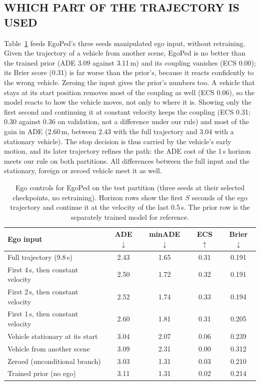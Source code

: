 \documentclass{ieeeoj}
\newcommand{\method}{EgoPed\xspace}
\begin{document}
\subsection{WHICH PART OF THE TRAJECTORY IS USED}
\label{sec:controls}

Table~\ref{tab:controls} feeds \method's three seeds manipulated ego input, without retraining.
Given the trajectory of a vehicle from another scene, \method is no better than the trained prior (ADE 3.09 against 3.11\,m) and its coupling vanishes (ECS 0.00); its Brier score (0.31) is far worse than the prior's, because it reacts confidently to the wrong vehicle. Zeroing the input gives the prior's numbers too. A vehicle that stays at its start position removes most of the coupling as well (ECS 0.06), so the model reacts to how the vehicle moves, not only to where it is.
Showing only the first second and continuing it at constant velocity keeps the coupling (ECS 0.31; 0.30 against 0.36 on validation, not a difference under our rule) and most of the gain in ADE (2.60\,m, between 2.43 with the full trajectory and 3.04 with a stationary vehicle). The stop decision is thus carried by the vehicle's early motion, and its later trajectory refines the path: the ADE cost of the 1\,s horizon meets our rule on both partitions. All differences between the full input and the stationary, foreign or zeroed vehicle meet it as well.

\begin{table}[t]
  \centering
  \caption{Ego controls for \method on the test partition (three seeds at their selected checkpoints, no retraining). Horizon rows show the first $S$ seconds of the ego trajectory and continue it at the velocity of the last 0.5\,s. The prior row is the separately trained model for reference.}
  \label{tab:controls}
  \vspace{3pt}
  \footnotesize
  \setlength{\tabcolsep}{3pt}
  \begin{tabular}{lcccc}
    \toprule
    Ego input & ADE $\downarrow$ & minADE $\downarrow$ & ECS $\uparrow$ & Brier $\downarrow$ \\
    \midrule
    Full trajectory (9.8\,s) & 2.43 & 1.65 & 0.31 & 0.191 \\
    First 4\,s, then constant velocity & 2.50 & 1.72 & 0.32 & 0.191 \\
    First 2\,s, then constant velocity & 2.52 & 1.74 & 0.33 & 0.194 \\
    First 1\,s, then constant velocity & 2.60 & 1.81 & 0.31 & 0.205 \\
    Vehicle stationary at its start & 3.04 & 2.07 & 0.06 & 0.239 \\
    Vehicle from another scene & 3.09 & 2.31 & 0.00 & 0.312 \\
    Zeroed (unconditional branch) & 3.03 & 1.31 & 0.03 & 0.210 \\
    \midrule
    Trained prior (no ego) & 3.11 & 1.31 & 0.02 & 0.214 \\
    \bottomrule
  \end{tabular}
\end{table}
\end{document}

